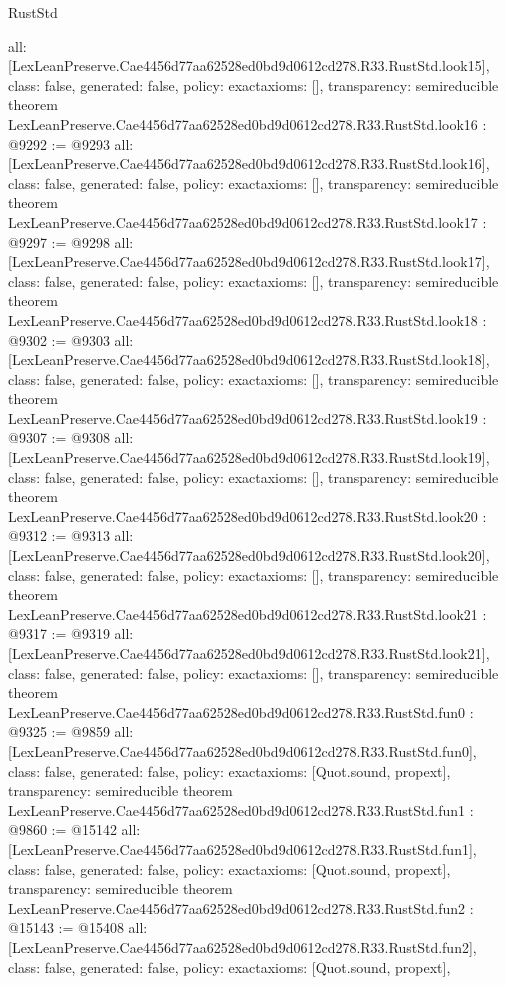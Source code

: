 \begin{lexlean}{RustStd}
\begin{coremodule}
{  all: [LexLeanPreserve.Cae4456d77aa62528ed0bd9d0612cd278.R33.RustStd.look15],
  class: false,
  generated: false,
  policy: exact{axioms: []},
  transparency: semireducible
}
theorem LexLeanPreserve.Cae4456d77aa62528ed0bd9d0612cd278.R33.RustStd.look16 : @9292 := @9293 {
  all: [LexLeanPreserve.Cae4456d77aa62528ed0bd9d0612cd278.R33.RustStd.look16],
  class: false,
  generated: false,
  policy: exact{axioms: []},
  transparency: semireducible
}
theorem LexLeanPreserve.Cae4456d77aa62528ed0bd9d0612cd278.R33.RustStd.look17 : @9297 := @9298 {
  all: [LexLeanPreserve.Cae4456d77aa62528ed0bd9d0612cd278.R33.RustStd.look17],
  class: false,
  generated: false,
  policy: exact{axioms: []},
  transparency: semireducible
}
theorem LexLeanPreserve.Cae4456d77aa62528ed0bd9d0612cd278.R33.RustStd.look18 : @9302 := @9303 {
  all: [LexLeanPreserve.Cae4456d77aa62528ed0bd9d0612cd278.R33.RustStd.look18],
  class: false,
  generated: false,
  policy: exact{axioms: []},
  transparency: semireducible
}
theorem LexLeanPreserve.Cae4456d77aa62528ed0bd9d0612cd278.R33.RustStd.look19 : @9307 := @9308 {
  all: [LexLeanPreserve.Cae4456d77aa62528ed0bd9d0612cd278.R33.RustStd.look19],
  class: false,
  generated: false,
  policy: exact{axioms: []},
  transparency: semireducible
}
theorem LexLeanPreserve.Cae4456d77aa62528ed0bd9d0612cd278.R33.RustStd.look20 : @9312 := @9313 {
  all: [LexLeanPreserve.Cae4456d77aa62528ed0bd9d0612cd278.R33.RustStd.look20],
  class: false,
  generated: false,
  policy: exact{axioms: []},
  transparency: semireducible
}
theorem LexLeanPreserve.Cae4456d77aa62528ed0bd9d0612cd278.R33.RustStd.look21 : @9317 := @9319 {
  all: [LexLeanPreserve.Cae4456d77aa62528ed0bd9d0612cd278.R33.RustStd.look21],
  class: false,
  generated: false,
  policy: exact{axioms: []},
  transparency: semireducible
}
theorem LexLeanPreserve.Cae4456d77aa62528ed0bd9d0612cd278.R33.RustStd.fun0 : @9325 := @9859 {
  all: [LexLeanPreserve.Cae4456d77aa62528ed0bd9d0612cd278.R33.RustStd.fun0],
  class: false,
  generated: false,
  policy: exact{axioms: [Quot.sound, propext]},
  transparency: semireducible
}
theorem LexLeanPreserve.Cae4456d77aa62528ed0bd9d0612cd278.R33.RustStd.fun1 : @9860 := @15142 {
  all: [LexLeanPreserve.Cae4456d77aa62528ed0bd9d0612cd278.R33.RustStd.fun1],
  class: false,
  generated: false,
  policy: exact{axioms: [Quot.sound, propext]},
  transparency: semireducible
}
theorem LexLeanPreserve.Cae4456d77aa62528ed0bd9d0612cd278.R33.RustStd.fun2 : @15143 := @15408 {
  all: [LexLeanPreserve.Cae4456d77aa62528ed0bd9d0612cd278.R33.RustStd.fun2],
  class: false,
  generated: false,
  policy: exact{axioms: [Quot.sound, propext]},
}
\end{coremodule}
\end{lexlean}
